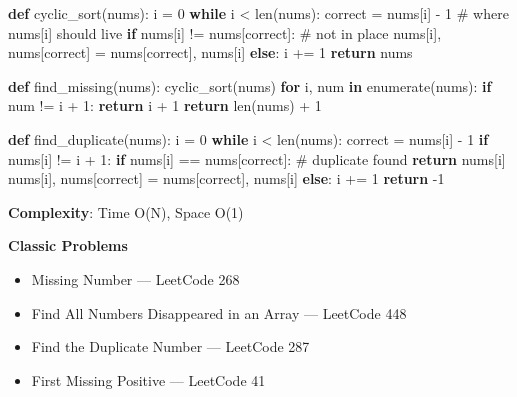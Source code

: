 \documentclass[11pt]{article}
\providecommand{\tightlist}{\setlength{\itemsep}{1pt}\setlength{\parskip}{0pt}}
\newenvironment{Shaded}{\begin{snugshade}}{\end{snugshade}}
\newcommand{\BuiltInTok}[1]{\textcolor[rgb]{0.50,0.55,0.55}{#1}}
\newcommand{\CommentTok}[1]{\textcolor[rgb]{0.48,0.49,0.49}{#1}}
\newcommand{\ControlFlowTok}[1]{\textcolor[rgb]{0.99,0.74,0.29}{\textbf{#1}}}
\newcommand{\DecValTok}[1]{\textcolor[rgb]{0.96,0.45,0.00}{#1}}
\newcommand{\KeywordTok}[1]{\textcolor[rgb]{0.81,0.81,0.76}{\textbf{#1}}}
\newcommand{\NormalTok}[1]{\textcolor[rgb]{0.81,0.81,0.76}{#1}}
\newcommand{\OperatorTok}[1]{\textcolor[rgb]{0.81,0.81,0.76}{#1}}
\begin{document}
\begin{Shaded}
\begin{Highlighting}[]
\KeywordTok{def}\NormalTok{ cyclic\_sort(nums):}
\NormalTok{    i }\OperatorTok{=} \DecValTok{0}
    \ControlFlowTok{while}\NormalTok{ i }\OperatorTok{\textless{}} \BuiltInTok{len}\NormalTok{(nums):}
\NormalTok{        correct }\OperatorTok{=}\NormalTok{ nums[i] }\OperatorTok{{-}} \DecValTok{1}               \CommentTok{\# where nums[i] should live}
        \ControlFlowTok{if}\NormalTok{ nums[i] }\OperatorTok{!=}\NormalTok{ nums[correct]:        }\CommentTok{\# not in place}
\NormalTok{            nums[i], nums[correct] }\OperatorTok{=}\NormalTok{ nums[correct], nums[i]}
        \ControlFlowTok{else}\NormalTok{:}
\NormalTok{            i }\OperatorTok{+=} \DecValTok{1}
    \ControlFlowTok{return}\NormalTok{ nums}

\KeywordTok{def}\NormalTok{ find\_missing(nums):}
\NormalTok{    cyclic\_sort(nums)}
    \ControlFlowTok{for}\NormalTok{ i, num }\KeywordTok{in} \BuiltInTok{enumerate}\NormalTok{(nums):}
        \ControlFlowTok{if}\NormalTok{ num }\OperatorTok{!=}\NormalTok{ i }\OperatorTok{+} \DecValTok{1}\NormalTok{:}
            \ControlFlowTok{return}\NormalTok{ i }\OperatorTok{+} \DecValTok{1}
    \ControlFlowTok{return} \BuiltInTok{len}\NormalTok{(nums) }\OperatorTok{+} \DecValTok{1}

\KeywordTok{def}\NormalTok{ find\_duplicate(nums):}
\NormalTok{    i }\OperatorTok{=} \DecValTok{0}
    \ControlFlowTok{while}\NormalTok{ i }\OperatorTok{\textless{}} \BuiltInTok{len}\NormalTok{(nums):}
\NormalTok{        correct }\OperatorTok{=}\NormalTok{ nums[i] }\OperatorTok{{-}} \DecValTok{1}
        \ControlFlowTok{if}\NormalTok{ nums[i] }\OperatorTok{!=}\NormalTok{ i }\OperatorTok{+} \DecValTok{1}\NormalTok{:}
            \ControlFlowTok{if}\NormalTok{ nums[i] }\OperatorTok{==}\NormalTok{ nums[correct]:    }\CommentTok{\# duplicate found}
                \ControlFlowTok{return}\NormalTok{ nums[i]}
\NormalTok{            nums[i], nums[correct] }\OperatorTok{=}\NormalTok{ nums[correct], nums[i]}
        \ControlFlowTok{else}\NormalTok{:}
\NormalTok{            i }\OperatorTok{+=} \DecValTok{1}
    \ControlFlowTok{return} \OperatorTok{{-}}\DecValTok{1}
\end{Highlighting}
\end{Shaded}

\textbf{Complexity}: Time O(N), Space O(1)

\textbf{Classic Problems}

\begin{itemize}
\tightlist
\item
  Missing Number --- LeetCode 268
\item
  Find All Numbers Disappeared in an Array --- LeetCode 448
\item
  Find the Duplicate Number --- LeetCode 287
\item
  First Missing Positive --- LeetCode 41
\end{itemize}
\end{document}
